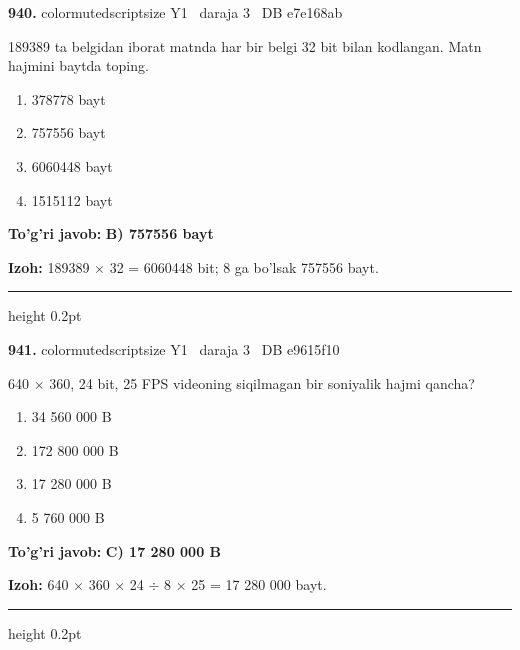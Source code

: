 \documentclass[10pt,a4paper,oneside]{article}
\begin{document}
\noindent\textbf{\color{ink}940.}  {color{muted}scriptsize Y1 \textbullet\ daraja 3 \textbullet\ DB e7e168ab}
\par
189389 ta belgidan iborat matnda har bir belgi 32 bit bilan kodlangan. Matn hajmini baytda toping.
\begin{enumerate}[label=\Alph*),leftmargin=9mm]
\item 378778 bayt
\item 757556 bayt
\item 6060448 bayt
\item 1515112 bayt
\end{enumerate}
\begin{tcolorbox}[enhanced,breakable,colback=teal!4,colframe=teal!50!black,boxrule=0.5pt,arc=1.1mm,left=3mm,right=3mm,top=1.7mm,bottom=1.7mm,before skip=2mm,after skip=2mm]
\textbf{\color{teal}To'g'ri javob:} \textbf{B) 757556 bayt}
\par\smallskip
\textbf{Izoh:} 189389 \ensuremath{\times} 32 = 6060448 bit; 8 ga bo'lsak 757556 bayt.
\end{tcolorbox}
\vspace{2mm}\hrule height 0.2pt \vspace{3mm}

\noindent\textbf{\color{ink}941.}  {color{muted}scriptsize Y1 \textbullet\ daraja 3 \textbullet\ DB e9615f10}
\par
640 \ensuremath{\times} 360, 24 bit, 25 FPS videoning siqilmagan bir soniyalik hajmi qancha?
\begin{enumerate}[label=\Alph*),leftmargin=9mm]
\item 34 560 000 B
\item 172 800 000 B
\item 17 280 000 B
\item 5 760 000 B
\end{enumerate}
\begin{tcolorbox}[enhanced,breakable,colback=teal!4,colframe=teal!50!black,boxrule=0.5pt,arc=1.1mm,left=3mm,right=3mm,top=1.7mm,bottom=1.7mm,before skip=2mm,after skip=2mm]
\textbf{\color{teal}To'g'ri javob:} \textbf{C) 17 280 000 B}
\par\smallskip
\textbf{Izoh:} 640 \ensuremath{\times} 360 \ensuremath{\times} 24 \ensuremath{\div} 8 \ensuremath{\times} 25 = 17 280 000 bayt.
\end{tcolorbox}
\vspace{2mm}\hrule height 0.2pt \vspace{3mm}
\end{document}
